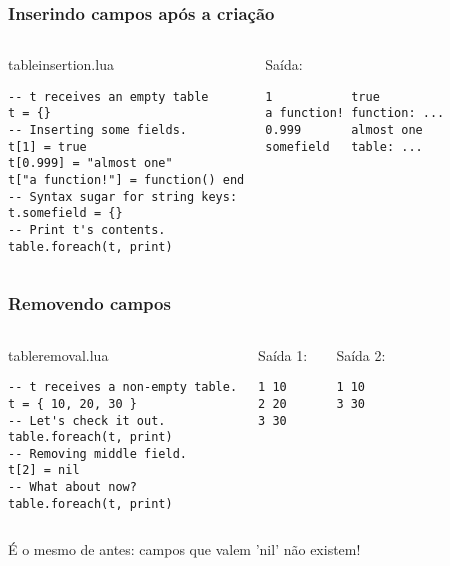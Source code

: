 \documentclass[brazil]{beamer}
\begin{document}
\begin{frame}[fragile]
  \frametitle{Inserindo campos após a criação}
  \pause
  \begin{columns}
      \begin{block}{tableinsertion.lua}
        \begin{lstlisting}
-- t receives an empty table
t = {}
-- Inserting some fields.
t[1] = true
t[0.999] = "almost one"
t["a function!"] = function() end
-- Syntax sugar for string keys:
t.somefield = {}
-- Print t's contents.
table.foreach(t, print)
        \end{lstlisting}
      \end{block}
    \pause
      \begin{block}{Saída:}
        \begin{verbatim}
1           true
a function! function: ...
0.999       almost one
somefield   table: ...    \end{verbatim}
      \end{block}
  \end{columns}
\end{frame}
\begin{frame}[fragile]
  \frametitle{Removendo campos}
  \pause
  \begin{columns}
      \begin{block}{tableremoval.lua}
        \begin{lstlisting}
-- t receives a non-empty table.
t = { 10, 20, 30 }
-- Let's check it out.
table.foreach(t, print)
-- Removing middle field.
t[2] = nil
-- What about now?
table.foreach(t, print)
        \end{lstlisting}
      \end{block}
    \pause
      \begin{block}{Saída 1:}
        \begin{verbatim}
1 10
2 20
3 30    \end{verbatim}
      \end{block}
      \begin{block}{Saída 2:}
        \begin{verbatim}
1 10
3 30    \end{verbatim}
      \end{block}
  \end{columns}
  \pause
  \begin{center}
    É o mesmo de antes: campos que valem 'nil' não existem!
  \end{center}
\end{frame}
\end{document}
